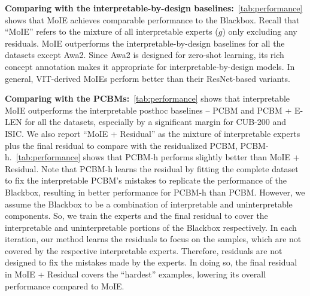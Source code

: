 
\textbf{Comparing with the interpretable-by-design baselines:}~\cref{tab:performance} shows that MoIE achieves comparable performance to the Blackbox. Recall that ``MoIE'' refers to the mixture of all interpretable experts ($g$) only excluding any residuals.
MoIE outperforms the interpretable-by-design baselines for all the datasets except Awa2. Since Awa2 is designed for zero-shot learning, its rich concept annotation makes it appropriate for interpretable-by-design models. In general, VIT-derived MoIEs perform better than their ResNet-based variants.

\textbf{Comparing with the PCBMs:}~\cref{tab:performance} shows that interpretable MoIE outperforms the interpretable posthoc baselines -- PCBM and PCBM + E-LEN for all the datasets, especially by a significant margin for CUB-200 and ISIC.
 We also report ``MoIE + Residual'' as the mixture of interpretable experts plus the final residual to compare with the residualized PCBM, \ie PCBM-h.~\cref{tab:performance} shows that PCBM-h performs slightly better than MoIE + Residual. Note that PCBM-h learns the residual by fitting the complete dataset to fix the interpretable PCBM's mistakes to replicate the performance of the Blackbox, resulting in better performance for PCBM-h than PCBM. However, we assume the Blackbox to be a combination of interpretable and uninterpretable components. So, we train the experts and the final residual to cover the interpretable and uninterpretable portions of the Blackbox respectively. In each iteration, our method learns the residuals to focus on the samples, which are not covered by the respective interpretable experts. Therefore, residuals are not designed to fix the mistakes made by the experts. In doing so, the final residual in MoIE + Residual covers the ``hardest'' examples, lowering its overall performance compared to MoIE. 

